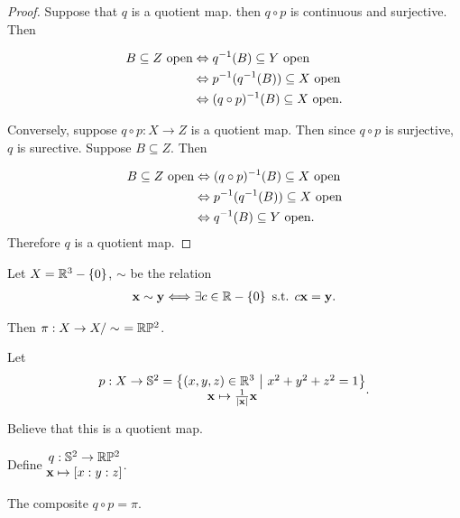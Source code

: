\documentclass[12pt, twosided]{article}
\begin{document}
\begin{proof}
  Suppose that \(q\) is a quotient map. then \(q \circ p\) is continuous and surjective. Then 

  \begin{align*}
    B \subseteq Z \text{ open} &\Leftrightarrow q^{-1}(B) \subseteq Y \text{ open} \\
                        &\Leftrightarrow p^{-1}(q^{-1}(B)) \subseteq X \text{ open} \\
                        &\Leftrightarrow (q \circ p)^{-1} (B) \subseteq X \text{ open}.
  \end{align*}\partdone

  Conversely, suppose \(q \circ p: X \to Z\) is a quotient map. Then since \(q \circ p\) is surjective, \(q\) is surective. Suppose \(B \subseteq Z\). Then

  \begin{align*}
    B \subseteq Z \text{ open} &\Leftrightarrow (q \circ p)^{-1}(B) \subseteq X \text{ open} \\
                        &\Leftrightarrow p^{-1}(q^{-1}(B)) \subseteq X \text{ open} \\
                        &\Leftrightarrow q^{-1}(B) \subseteq Y \text{ open}.                
  \end{align*}
  Therefore \(q\) is a quotient map.
\end{proof}

\begin{exa}
  Let \(X = \mathbb{R}^3 - \left\{ 0 \right\}\), \(\sim\) be the relation
  \begin{align*}
    \mathbf{x} \sim \mathbf{y} \Longleftrightarrow \exists c \in \mathbb{R} - \left\{ 0 \right\} \text{ s.t. } c\mathbf{x} = \mathbf{y}.
  \end{align*}

  Then \(\pi: X \to X/\sim\ = \mathbb{R}\mathbb{P}^2\).

  Let \[
  \begin{matrix}
    p: X \to \mathbb{S}^2 = \left\{ (x, y, z) \in \mathbb{R}^3 \ \middle\vert\  x^2 + y^2 + z^2 =1 \right\} \\ \mathbf{x} \mapsto \frac{1}{|\mathbf{x}|}\mathbf{x}
  \end{matrix}.
  \]

  Believe that this is a quotient map.

  Define \(
  \begin{matrix}
q : \mathbb{S}^2 \to \mathbb{R}\mathbb{P}^2 \\ \mathbf{x} \mapsto [x:y:z]
  \end{matrix}
  \).

  The composite \(q \circ p = \pi\).
\end{exa}
\end{document}
